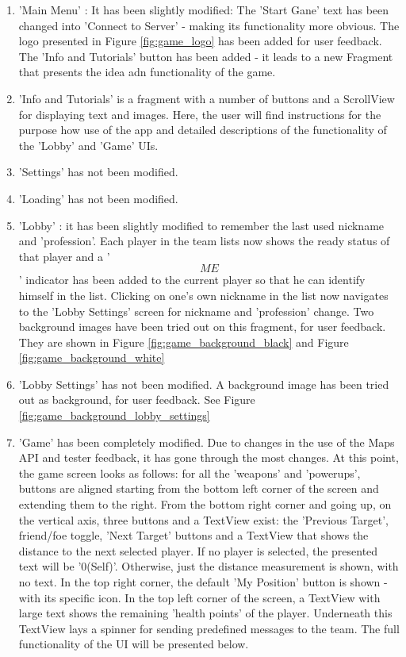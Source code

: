 \begin{enumerate}
  \item 'Main Menu' : It has been slightly modified: The 'Start Gane' text has
  been changed into 'Connect to Server' - making its functionality more
  obvious. The logo presented in Figure \ref{fig:game_logo} has been added for
  user feedback. The 'Info and Tutorials' button has been added - it leads to
  a new Fragment that presents the idea adn functionality of the game.
  
  \item 'Info and Tutorials' is a fragment with a number of buttons and a
  ScrollView for displaying text and images. Here, the user will find
  instructions for the purpose how use of the app and detailed descriptions of
  the functionality of the 'Lobby' and 'Game' UIs.
  
  \item 'Settings' has not been modified.
  
  \item 'Loading' has not been modified.
  
  \item 'Lobby' : it has been slightly modified to remember the last used
  nickname and 'profession'. Each player in the team lists now shows the ready
  status of that player and a '\[ME\]' indicator has been added to the current
  player so that he can identify himself in the list. Clicking on one's own
  nickname in the list now navigates to the 'Lobby Settings' screen for
  nickname and 'profession' change. Two background images have been tried out on
  this fragment, for user feedback. They are shown in Figure
  \ref{fig:game_background_black} and Figure \ref{fig:game_background_white} 
  
  \item 'Lobby Settings' has not been modified. A background image has been
  tried out as background, for user feedback. See Figure
  \ref{fig:game_background_lobby_settings}
  
  \item 'Game' has been completely modified. Due to changes in the use of the
  Maps API and tester feedback, it has gone through the most changes. At this
  point, the game screen looks as follows: for all the 'weapons' and 'powerups',
  buttons are aligned starting from the bottom left corner of the screen and
  extending them to the right. From the bottom right corner and going up, on the
  vertical axis, three buttons and a TextView exist: the 'Previous Target',
  friend/foe toggle, 'Next Target' buttons and a TextView that shows the
  distance to the next selected player. If no player is selected, the presented
  text will be '0(Self)'. Otherwise, just the distance measurement is shown,
  with no text. In the top right corner, the default 'My Position' button is
  shown - with its specific icon. In the top left corner of the screen, a
  TextView with large text shows the remaining 'health points' of the player.
  Underneath this TextView lays a spinner for sending predefined messages to the
  team. The full functionality of the UI will be presented below.
  
\end{enumerate}

